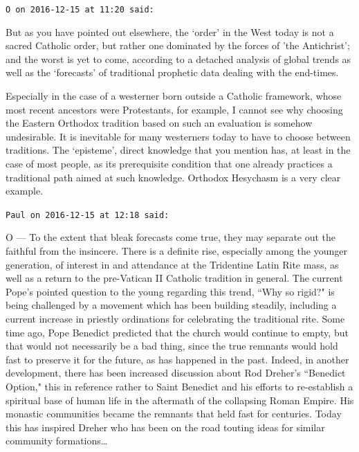\begin{footnotesize}\begin{sffamily}



\texttt{O on 2016-12-15 at 11:20 said: }

But as you have pointed out elsewhere, the `order' in the West today is not a sacred Catholic order, but rather one dominated by the forces of 'the Antichrist'; and the worst is yet to come, according to a detached analysis of global trends as well as the `forecasts' of traditional prophetic data dealing with the end-times.

Especially in the case of a westerner born outside a Catholic framework, whose most recent ancestors were Protestants, for example, I cannot see why choosing the Eastern Orthodox tradition based on such an evaluation is somehow undesirable. It is inevitable for many westerners today to have to choose between traditions. The `episteme', direct knowledge that you mention has, at least in the case of most people, as its prerequisite condition that one already practices a traditional path aimed at such knowledge. Orthodox Hesychasm is a very clear example.


\hfill

\texttt{Paul on 2016-12-15 at 12:18 said: }

O — To the extent that bleak forecasts come true, they may separate out the faithful from the insincere. There is a definite rise, especially among the younger generation, of interest in and attendance at the Tridentine Latin Rite mass, as well as a return to the pre-Vatican II Catholic tradition in general. The current Pope's pointed question to the young regarding this trend, ``Why so rigid?" is being challenged by a movement which has been building steadily, including a current increase in priestly ordinations for celebrating the traditional rite. Some time ago, Pope Benedict predicted that the church would continue to empty, but that would not necessarily be a bad thing, since the true remnants would hold fast to preserve it for the future, as has happened in the past. Indeed, in another development, there has been increased discussion about Rod Dreher's ``Benedict Option," this in reference rather to Saint Benedict and his efforts to re-establish a spiritual base of human life in the aftermath of the collapsing Roman Empire. His monastic communities became the remnants that held fast for centuries. Today this has inspired Dreher who has been on the road touting ideas for similar community formations…



\end{sffamily}
\end{footnotesize}

